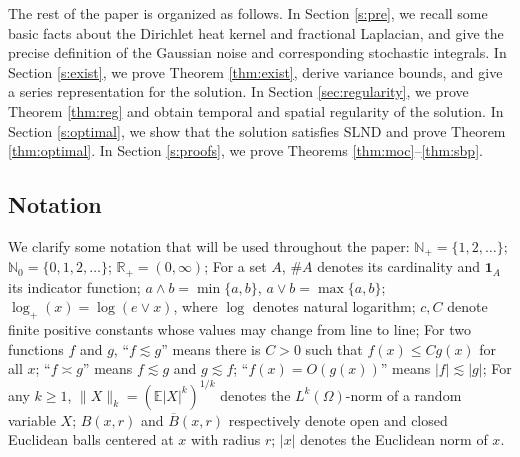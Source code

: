 \documentclass[reqno]{amsart}
\DeclareMathOperator{\dist}{dist}
\newcommand{\R}{\mathbb R}
\newcommand{\E}{\mathbb E}
\newcommand{\1}{\mathbf 1}
\numberwithin{equation}{section}
\theoremstyle{definition}
\begin{document}
The rest of the paper is organized as follows. 
In Section \ref{s:pre}, we recall some basic facts about the Dirichlet heat kernel and fractional Laplacian, and give the precise definition of the Gaussian noise and corresponding stochastic integrals.
In Section \ref{s:exist}, we prove Theorem \ref{thm:exist}, derive variance bounds, and give a series representation for the solution.
In Section \ref{sec:regularity}, we prove Theorem \ref{thm:reg} and obtain temporal and spatial regularity of the solution.
In Section \ref{s:optimal}, we show that the solution satisfies SLND and prove Theorem \ref{thm:optimal}.
In Section \ref{s:proofs}, we prove Theorems \ref{thm:moc}--\ref{thm:sbp}.

\subsection{Notation}
We clarify some notation that will be used throughout the paper:
\(\mathbb N_+=\{1,2,\ldots\}\); \(\mathbb N_0=\{0,1,2,\ldots\}\);
\(\R_+=(0,\infty)\);
For a set \(A\), \(\#A\) denotes its cardinality and \(\1_A\) its indicator
function; \(a\wedge b=\min\{a,b\}\),
\(a\vee b=\max\{a,b\}\); $\log_+(x) = \log(e \vee x)$, where $\log$ denotes natural logarithm; \(c,C\) denote finite positive constants
whose values may change from line to line; For two functions \(f\)
and \(g\), ``\(f\lesssim g\)'' means there is $C>0$ such that \(f(x)\le Cg(x)\) for all $x$; ``\(f\asymp g\)'' means
\(f\lesssim g\) and \(g\lesssim f\); ``\(f(x)=O(g(x))\)'' means \(|f|\lesssim |g|\); For any $k \ge 1$, $\|X\|_k = (\E|X|^k)^{1/k}$ denotes the $L^k(\Omega)$-norm of a random variable $X$; $B(x,r)$ and $\overline{B}(x,r)$ respectively denote open and closed Euclidean balls centered at $x$ with radius $r$; $|x|$ denotes the Euclidean norm of $x$.
\end{document}
